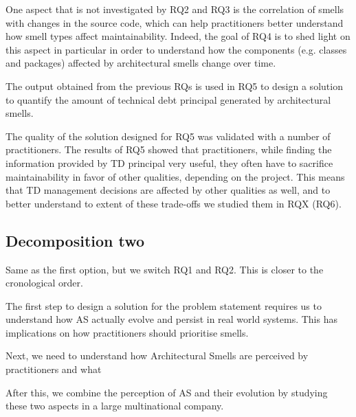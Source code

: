 One aspect that is not investigated by RQ2 and RQ3 is the correlation of smells with changes in the source code, which can help practitioners better understand how smell types affect maintainability. Indeed, the goal of RQ4 is to shed light on this aspect in particular in order to understand how the components (e.g. classes and packages) affected by architectural smells change over time.

The output obtained from the previous RQs is used in RQ5 to design a solution to quantify the amount of technical debt principal generated by architectural smells.

The quality of the solution designed for RQ5 was validated with a number of practitioners.
The results of RQ5 showed that practitioners, while finding the information provided by TD principal very useful, they often have to sacrifice maintainability in favor of other qualities, depending on the project.
This means that TD management decisions are affected by other qualities as well, and to better understand to extent of these trade-offs we studied them in RQX (RQ6).


\subsection{Decomposition two}
Same as the first option, but we switch RQ1 and RQ2. This is closer to the cronological order.

The first step to design a solution for the problem statement requires us to understand how AS actually evolve and persist in real world systems.
This has implications on how practitioners should prioritise smells.

Next, we need to understand how Architectural Smells are perceived by practitioners and what 

After this, we combine the perception of AS and their evolution by studying these two aspects in a large multinational company.

    
